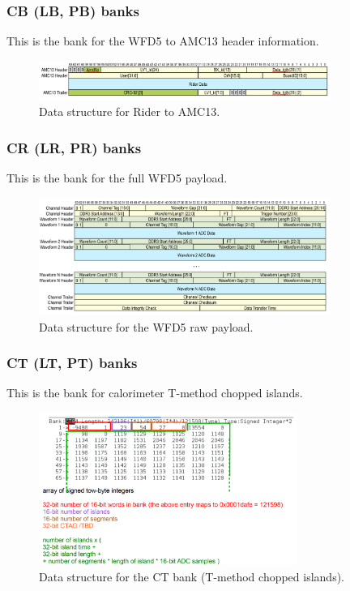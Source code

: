 \subsubsection*{CB (LB, PB) banks}

This is the bank for the WFD5 to AMC13 header information. 

\begin{figure}[htbp]
\centering
\includegraphics[width=0.85\textwidth]{pics/RiderToAMC13.pdf} 
\caption{Data structure for Rider to AMC13.}\label{fig:RiderToAMC13}
\end{figure}

\subsubsection*{CR (LR, PR) banks}

This is the bank for the full WFD5 payload.

\begin{figure}[htbp]
\centering
\includegraphics[width=0.85\textwidth]{pics/RiderData.pdf} 
\caption{Data structure for the WFD5 raw payload.}\label{fig:RiderData}
\end{figure}


\subsubsection*{CT (LT, PT) banks}

This is the bank for calorimeter T-method chopped islands.

\begin{figure}[htbp]
\centering
\includegraphics[width=0.75\textwidth]{pics/CTBankFormat.pdf} 
\caption{Data structure for the CT bank (T-method chopped islands).}\label{fig:CTBankFormat}
\end{figure}

